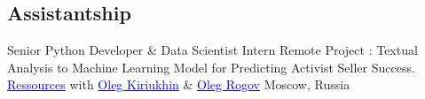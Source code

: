 \vspace{1mm}
\newpage

\subsection{\textbf{Assistantship}}

    {Senior Python Developer \& Data Scientist Intern}
    {Remote}
    {
    \newline
    Project : Textual Analysis to Machine Learning Model for Predicting Activist Seller Success.
    \href{https://www.linkedin.com/posts/daglox-kankwanda-59a617182_short-activist-predictor-activity-7129183448644083712-BFpY?utm_source=share&utm_medium=member_desktop}{\textcolor{blue}{Ressources}} 
    with \href{https://linkedin.com/in/kiryukhin}{\textcolor{blue}{Oleg Kiriukhin}} \& \href{https://linkedin.com/in/oleg3372}{\textcolor{blue}{Oleg Rogov}}
    }
    {Moscow, Russia}
